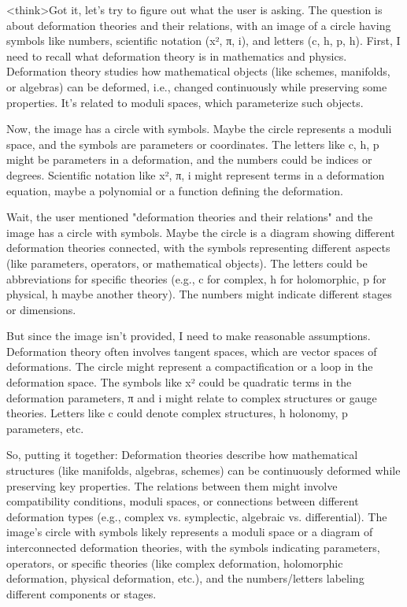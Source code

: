 <think>Got it, let's try to figure out what the user is asking. The question is about deformation theories and their relations, with an image of a circle having symbols like numbers, scientific notation (x², π, i), and letters (c, h, p, h). First, I need to recall what deformation theory is in mathematics and physics. Deformation theory studies how mathematical objects (like schemes, manifolds, or algebras) can be deformed, i.e., changed continuously while preserving some properties. It's related to moduli spaces, which parameterize such objects.

Now, the image has a circle with symbols. Maybe the circle represents a moduli space, and the symbols are parameters or coordinates. The letters like c, h, p might be parameters in a deformation, and the numbers could be indices or degrees. Scientific notation like x², π, i might represent terms in a deformation equation, maybe a polynomial or a function defining the deformation.

Wait, the user mentioned "deformation theories and their relations" and the image has a circle with symbols. Maybe the circle is a diagram showing different deformation theories connected, with the symbols representing different aspects (like parameters, operators, or mathematical objects). The letters could be abbreviations for specific theories (e.g., c for complex, h for holomorphic, p for physical, h maybe another theory). The numbers might indicate different stages or dimensions.

But since the image isn't provided, I need to make reasonable assumptions. Deformation theory often involves tangent spaces, which are vector spaces of deformations. The circle might represent a compactification or a loop in the deformation space. The symbols like x² could be quadratic terms in the deformation parameters, π and i might relate to complex structures or gauge theories. Letters like c could denote complex structures, h holonomy, p parameters, etc.

So, putting it together: Deformation theories describe how mathematical structures (like manifolds, algebras, schemes) can be continuously deformed while preserving key properties. The relations between them might involve compatibility conditions, moduli spaces, or connections between different deformation types (e.g., complex vs. symplectic, algebraic vs. differential). The image's circle with symbols likely represents a moduli space or a diagram of interconnected deformation theories, with the symbols indicating parameters, operators, or specific theories (like complex deformation, holomorphic deformation, physical deformation, etc.), and the numbers/letters labeling different components or stages.

